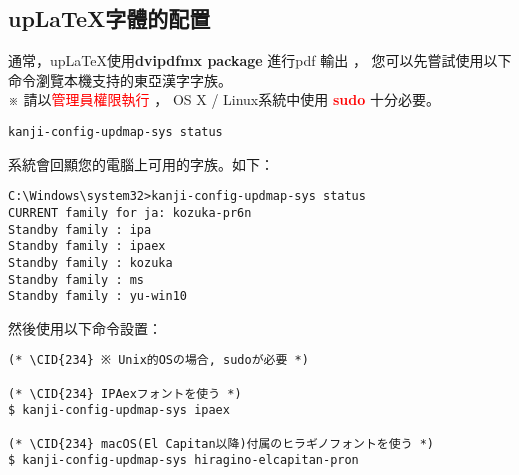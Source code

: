 \documentclass[a4,11pt,uplatex,openleft]{jsarticle}
\newcommand{\red}[1]{\textcolor{red}{#1}}
\begin{document}
\begin{appendix}


\section{up\LaTeX 字體的配置}
\par  通常，up\LaTeX 使用{\bfseries dvipdfmx package } 進行pdf 輸出 ，
您可以先嘗試使用以下命令瀏覽本機支持的東亞漢字字族。\\
※ 請\hspace{3pt}以\red{管理員權限執行} ，
OS X / Linux系統中使用 \red{\bfseries sudo} 十分必要。
\begin{lstlisting}
kanji-config-updmap-sys status
\end{lstlisting}

系統會回顯您的電腦上可用的字族。如下：
\begin{lstlisting}
C:\Windows\system32>kanji-config-updmap-sys status
CURRENT family for ja: kozuka-pr6n
Standby family : ipa
Standby family : ipaex
Standby family : kozuka
Standby family : ms
Standby family : yu-win10
\end{lstlisting}



然後使用以下命令設置：
\begin{lstlisting}
(* \CID{234} ※ Unix的OSの場合, sudoが必要 *)

(* \CID{234} IPAexフォントを使う *)
$ kanji-config-updmap-sys ipaex

(* \CID{234} macOS(El Capitan以降)付属のヒラギノフォントを使う *)
$ kanji-config-updmap-sys hiragino-elcapitan-pron


\end{lstlisting}
\end{appendix}
\end{document}
